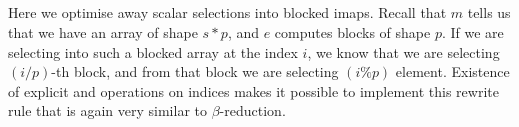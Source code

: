 \begin{code}%
\>[0]\AgdaSpace{}%
\AgdaSymbol{:}\AgdaSpace{}%
\AgdaSpace{}%
\AgdaSpace{}%
\AgdaSpace{}%
\AgdaSpace{}%
\AgdaSpace{}%
\AgdaSpace{}%
\<%
\\
\>[0]\AgdaSpace{}%
\AgdaSymbol{(}\AgdaSpace{}%
\AgdaSpace{}%
\AgdaSymbol{)}\AgdaSpace{}%
\AgdaSpace{}%
\AgdaSpace{}%
\AgdaSpace{}%
\AgdaSymbol{|}\AgdaSpace{}%
\AgdaSpace{}%
\<%
\\
\>[0]\AgdaSpace{}%
\AgdaSymbol{|}\AgdaSpace{}%
\AgdaSpace{}%
\AgdaSpace{}%
%
\>[24]\AgdaSymbol{|}\AgdaSpace{}%
\AgdaSpace{}%
\AgdaSymbol{=}\AgdaSpace{}%
\AgdaSpace{}%
\AgdaSymbol{(}\AgdaSpace{}%
\AgdaSpace{}%
\AgdaSpace{}%
\AgdaSymbol{(}\AgdaSpace{}%
\AgdaSpace{}%
\AgdaSymbol{))}\AgdaSpace{}%
\AgdaSymbol{(}\AgdaSpace{}%
\AgdaSpace{}%
\AgdaSymbol{)}\<%
\\
\>[0]\AgdaSpace{}%
\AgdaSymbol{|}\AgdaSpace{}%
\AgdaSpace{}%
\AgdaSpace{}%
\AgdaSpace{}%
\AgdaSpace{}%
%
\>[24]\AgdaSymbol{|}\AgdaSpace{}%
\AgdaSpace{}%
\AgdaSymbol{=}\AgdaSpace{}%
\AgdaSpace{}%
\AgdaSpace{}%
\AgdaSymbol{(}\AgdaSpace{}%
\AgdaSpace{}%
\AgdaSpace{}%
\AgdaSpace{}%
\AgdaSymbol{)}\<%
\\
\>[0]\<%
\end{code}
Here we optimise away scalar selections into blocked imaps.  Recall that $m$ tells us
that we have an array of shape $s * p$, and $e$ computes blocks of shape $p$.  If we
are selecting into such a blocked array at the index $i$, we know that we are selecting
$(i / p)$-th block, and from that block we are selecting $(i \% p)$ element.  Existence
of explicit  and  operations on indices makes it possible to implement
this rewrite rule that is again very similar to $\beta$-reduction.
